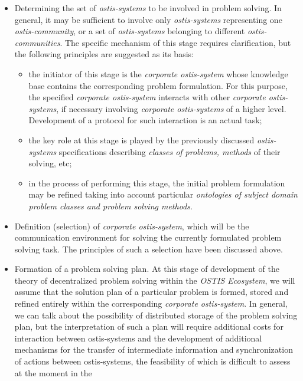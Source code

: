 \documentclass[9pt, letterpaper]{article}
\begin{document}
\begin{spacing}{0.97}
\begin{multicols}
\begin{itemize}
    \item Determining the set of \textit{ostis-systems} to be involved in problem solving. In general, it may be
sufficient to involve only \textit{ostis-systems} representing
one \textit{ostis-community}, or a set of \textit{ostis-systems} belonging to different \textit{ostis-communities}. The specific
mechanism of this stage requires clarification, but
the following principles are suggested as its basis:
    \begin{itemize}
        \item the initiator of this stage is the \textit{corporate ostis-system} whose knowledge base contains the corresponding problem formulation. For this purpose,
the specified \textit{corporate ostis-system} interacts with
other \textit{corporate ostis-systems}, if necessary involving \textit{corporate ostis-systems} of a higher level.
Development of a protocol for such interaction is
an actual task;
        \item the key role at this stage is played by the previously discussed \textit{ostis-systems} specifications describing \textit{classes of problems, methods} of their
solving, etc;
        \item in the process of performing this stage, the initial
problem formulation may be refined taking into
account particular \textit{ontologies of subject domain
problem classes and problem solving methods}.
    \end{itemize}
    \item Definition (selection) of \textit{corporate ostis-system},
which will be the communication environment for
solving the currently formulated problem solving
task. The principles of such a selection have been
discussed above.
    \item Formation of a problem solving plan. At this
stage of development of the theory of decentralized
problem solving within the \textit{OSTIS Ecosystem}, we
will assume that the solution plan of a particular
problem is formed, stored and refined entirely within
the corresponding \textit{corporate ostis-system}. In general,
we can talk about the possibility of distributed
storage of the problem solving plan, but the interpretation of such a plan will require additional
costs for interaction between ostis-systems and the
development of additional mechanisms for the transfer of intermediate information and synchronization
of actions between ostis-systems, the feasibility of
which is difficult to assess at the moment in the

\end{itemize}
\end{multicols}
\end{spacing}
\end{document}
